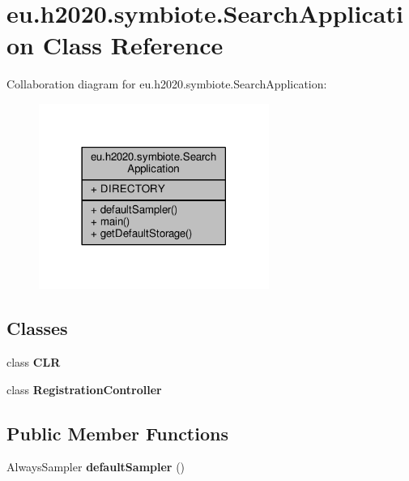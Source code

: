 \hypertarget{classeu_1_1h2020_1_1symbiote_1_1SearchApplication}{}\section{eu.\+h2020.\+symbiote.\+Search\+Application Class Reference}
\label{classeu_1_1h2020_1_1symbiote_1_1SearchApplication}


Collaboration diagram for eu.\+h2020.\+symbiote.\+Search\+Application\+:
\nopagebreak
\begin{figure}[H]
\begin{center}
\leavevmode
\includegraphics[width=213pt]{classeu_1_1h2020_1_1symbiote_1_1SearchApplication__coll__graph}
\end{center}
\end{figure}
\subsection*{Classes}
\begin{DoxyCompactItemize}
\item 
class {\bfseries C\+LR}
\item 
class {\bfseries Registration\+Controller}
\end{DoxyCompactItemize}
\subsection*{Public Member Functions}
\begin{DoxyCompactItemize}
\item 
Always\+Sampler {\bfseries default\+Sampler} ()\hypertarget{classeu_1_1h2020_1_1symbiote_1_1SearchApplication_a789d12cf4a0d122b6c98c80c096df80f}{}\label{classeu_1_1h2020_1_1symbiote_1_1SearchApplication_a789d12cf4a0d122b6c98c80c096df80f}

\end{DoxyCompactItemize}
